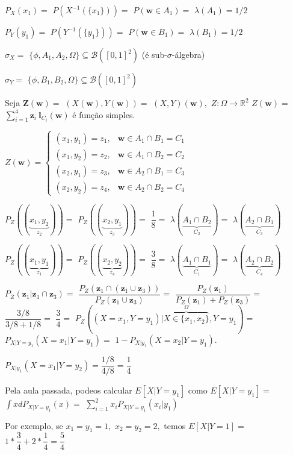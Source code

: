\documentclass[
]{book}
\begin{document}
\(P_X(x_1)=\) \(P(X^{-1}(\{x_1\}))=\) \(P(\boldsymbol w \in A_1)=\) \(\lambda(A_1)=1/2\)

\(P_Y(y_1)=\) \(P(Y^{-1}(\{y_1\}))=\) \(P(\boldsymbol w \in B_1)=\) \(\lambda(B_1)=1/2\)

\(\sigma_X =\) \(\{\phi,A_1,A_2,\Omega\} \subseteq \mathcal{B}([0,1]^2)\) (é sub-\(\sigma\)-álgebra)

\(\sigma_Y =\) \(\{\phi,B_1,B_2,\Omega\} \subseteq \mathcal{B}([0,1]^2)\)

Seja \(\boldsymbol Z(\boldsymbol w)=\) \((X(\boldsymbol w), Y(\boldsymbol w))=\) \((X,Y)(\boldsymbol w),\) \(Z: \Omega\longrightarrow \mathbb{R}^2\) \(Z(\boldsymbol w)=\) \(\sum_{i=1}^4 \boldsymbol z_i ~\mathbb{I}_{C_i}(\boldsymbol w)\) é função simples.

\(Z(\boldsymbol w)=\left\{\begin{array}{ll} (x_1,y_1)=z_1, & \boldsymbol w \in A_1 \cap B_1=C_1\\ (x_1,y_2)=z_2, & \boldsymbol w \in A_1 \cap B_2=C_2\\ (x_2,y_1)=z_3, & \boldsymbol w \in A_2 \cap B_1=C_3\\ (x_2,y_2)=z_4, & \boldsymbol w \in A_2 \cap B_2=C_4 \end{array}\right.\)

\(P_Z((\underbrace{x_1,y_2}_{z_2}))=\) \(P_Z((\underbrace{x_2,y_1}_{z_3}))=\) \(\dfrac{1}{8}=\) \(\lambda(\underbrace{A_1\cap B_2}_{C_2})=\) \(\lambda(\underbrace{A_2\cap B_1}_{C_3})\)

\(P_Z((\underbrace{x_1,y_1}_{z_1}))=\) \(P_Z((\underbrace{x_2,y_2}_{z_4}))=\) \(\dfrac{3}{8}=\) \(\lambda(\underbrace{A_1\cap B_1}_{C_1})=\) \(\lambda(\underbrace{A_2\cap B_2}_{C_4})\)

\(P_Z(\boldsymbol z_1| \boldsymbol z_1 \cap \boldsymbol z_3)=\) \(\dfrac{P_Z(\boldsymbol z_1 \cap (\boldsymbol z_1 \cup \boldsymbol z_3))}{P_Z(\boldsymbol z_1 \cup \boldsymbol z_3)}=\) \(\dfrac{P_Z(\boldsymbol z_1)}{P_Z(\boldsymbol z_1)+P_Z(\boldsymbol z_3)}=\) \(\dfrac{3/8}{3/8 + 1/8}=\) \(\dfrac{3}{4}=\) \(P_Z((X=x_1,Y=y_1)|\overbrace{X \in \{x_1,x_2\}}^{\Omega}, Y=y_1)=\) \(P_{X|Y=y_1}(X=x_1|Y=y_1)=\) \(1-P_{X|y_1}(X=x_2|Y=y_1).\)

\(P_{X|y_1}(X=x_1|Y=y_2)= \dfrac{1/8}{4/8}=\dfrac{1}{4}\)

Pela aula passada, podeos calcular \(E[X|Y=y_1]\) como \(E[X|Y=y_1]=\) \(\int x dP_{X|Y=y_1}(x)=\) \(\sum_{i=1}^2x_i P_{X|Y=y_1}(x_i|y_1)\)

Por exemplo, se \(x_1=y_1=1,\) \(x_2=y_2=2,\) temos \(E[X|Y=1]=\) \(1*\dfrac{3}{4}+2*\dfrac{1}{4}=\dfrac{5}{4}\)
\end{document}
